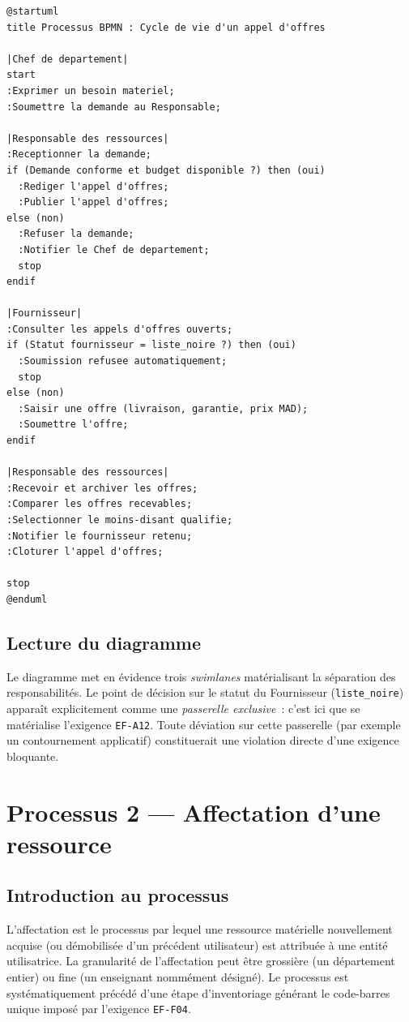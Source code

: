 \documentclass[a4paper,11pt,openany]{report}
\begin{document}
\begin{lstlisting}[caption={Processus BPMN --- Appel d'offres},
                   label={lst:bpmnAppelOffres}]
@startuml
title Processus BPMN : Cycle de vie d'un appel d'offres

|Chef de departement|
start
:Exprimer un besoin materiel;
:Soumettre la demande au Responsable;

|Responsable des ressources|
:Receptionner la demande;
if (Demande conforme et budget disponible ?) then (oui)
  :Rediger l'appel d'offres;
  :Publier l'appel d'offres;
else (non)
  :Refuser la demande;
  :Notifier le Chef de departement;
  stop
endif

|Fournisseur|
:Consulter les appels d'offres ouverts;
if (Statut fournisseur = liste_noire ?) then (oui)
  :Soumission refusee automatiquement;
  stop
else (non)
  :Saisir une offre (livraison, garantie, prix MAD);
  :Soumettre l'offre;
endif

|Responsable des ressources|
:Recevoir et archiver les offres;
:Comparer les offres recevables;
:Selectionner le moins-disant qualifie;
:Notifier le fournisseur retenu;
:Cloturer l'appel d'offres;

stop
@enduml
\end{lstlisting}

\subsection{Lecture du diagramme}

Le diagramme met en évidence trois \emph{swimlanes} matérialisant
la séparation des responsabilités. Le point de décision sur le
statut du Fournisseur (\texttt{liste\_noire}) apparaît
explicitement comme une \emph{passerelle exclusive}~: c'est ici
que se matérialise l'exigence \texttt{EF-A12}. Toute déviation
sur cette passerelle (par exemple un contournement applicatif)
constituerait une violation directe d'une exigence bloquante.

\section{Processus 2 --- Affectation d'une ressource}

\subsection{Introduction au processus}

L'affectation est le processus par lequel une ressource matérielle
nouvellement acquise (ou démobilisée d'un précédent utilisateur)
est attribuée à une entité utilisatrice. La granularité de
l'affectation peut être grossière (un département entier) ou fine
(un enseignant nommément désigné). Le processus est
systématiquement précédé d'une étape d'inventoriage générant le
code-barres unique imposé par l'exigence \texttt{EF-F04}.
\end{document}
